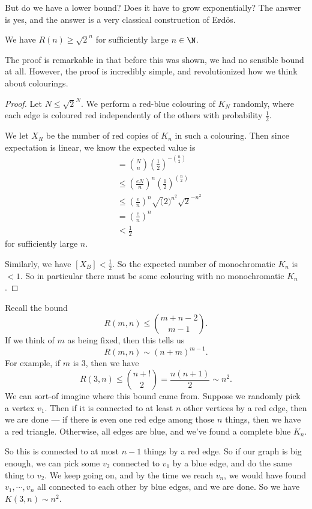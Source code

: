 \documentclass[a4paper]{article}
\begin{document}
But do we have a lower bound? Does it have to grow exponentially? The answer is yes, and the answer is a very classical construction of Erd\"os.

\begin{thm}
  We have $R(n) \geq \sqrt{2}^n$ for sufficiently large $n \in \N$.
\end{thm}
The proof is remarkable in that before this was shown, we had no sensible bound at all. However, the proof is incredibly simple, and revolutionized how we think about colourings.

\begin{proof}
  Let $N \leq \sqrt{2}^N$. We perform a red-blue colouring of $K_N$ randomly, where each edge is coloured red independently of the others with probability $\frac{1}{2}$.

  We let $X_R$ be the number of red copies of $K_n$ in such a colouring. Then since expectation is linear, we know the expected value is
  \begin{align*}
    [X_R] &= \binom{N}{n} \left(\frac{1}{2}\right)^{-\binom{n}{2}}\\
    &\leq \left(\frac{eN}{n}\right)^n \left(\frac{1}{2}\right)^{\binom{n}{2}}\\
    &\leq \left(\frac{e}{n}\right)^n \sqrt(2)^{n^2} \sqrt{2}^{-n^2}\\
    &= \left(\frac{e}{n}\right)^{n}\\
    &< \frac{1}{2}
  \end{align*}
  for sufficiently large $n$.

  Similarly, we have $[X_B] < \frac{1}{2}$. So the expected number of monochromatic $K_n$ is $< 1$. So in particular there must be some colouring with no monochromatic $K_n$.
\end{proof}

Recall the bound
\[
  R(m, n) \leq \binom{m + n - 2}{m - 1}.
\]
If we think of $m$ as being fixed, then this tells us
\[
  R(m, n) \sim (n + m)^{m - 1}.
\]
For example, if $m$ is $3$, then we have
\[
  R(3, n) \leq \binom{n + !}{2} = \frac{n(n + 1)}{2} \sim n^2.
\]
We can sort-of imagine where this bound came from. Suppose we randomly pick a vertex $v_1$. Then if it is connected to at least $n$ other vertices by a red edge, then we are done --- if there is even one red edge among those $n$ things, then we have a red triangle. Otherwise, all edges are blue, and we've found a complete blue $K_n$.

So this is connected to at most $n - 1$ things by a red edge. So if our graph is big enough, we can pick some $v_2$ connected to $v_1$ by a blue edge, and do the same thing to $v_2$. We keep going on, and by the time we reach $v_n$, we would have found $v_1, \cdots, v_n$ all connected to each other by blue edges, and we are done. So we have $K(3, n) \sim n^2$.
\end{document}
